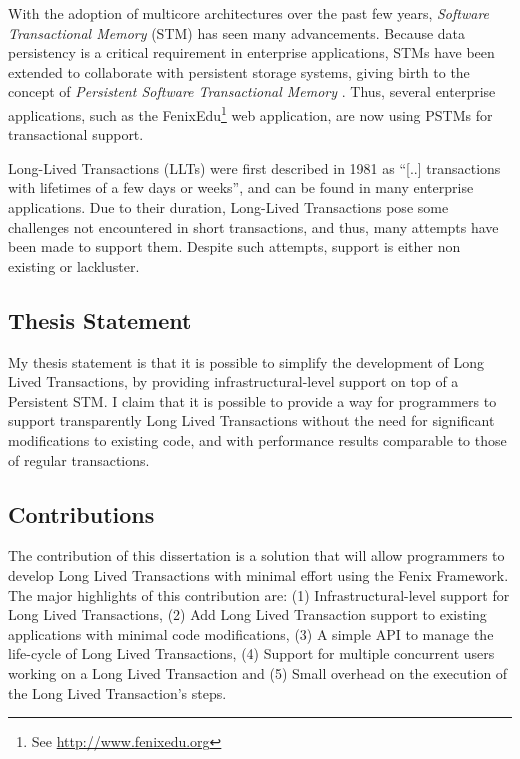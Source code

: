 \documentclass{llncs}
\begin{document}
With the adoption of multicore architectures over the past few years,
{\it Software Transactional Memory} (STM) has seen many advancements.
Because data persistency is a critical requirement in enterprise
applications, STMs have been extended to collaborate with persistent
storage systems, giving birth to the concept of {\it Persistent
  Software Transactional Memory} \cite{fernandes2011strict}. Thus,
several enterprise applications, such as the FenixEdu\footnote{See
  \url{http://www.fenixedu.org}} web application, are now using
PSTMs for transactional support.

Long-Lived Transactions (LLTs) were first described in 1981 as ``[..]
transactions with lifetimes of a few days or
weeks''\cite{gray1981transaction}, and can be found in many enterprise
applications. Due to their duration, Long-Lived Transactions pose some
challenges not encountered in short transactions, and thus, many
attempts have been made to support them. Despite such attempts,
support is either non existing or lackluster.

\subsection{Thesis Statement}

My thesis statement is that it is possible to simplify the development
of Long Lived Transactions, by providing infrastructural-level support
on top of a Persistent STM. I claim that it is possible to provide a
way for programmers to support transparently Long Lived Transactions
without the need for significant modifications to existing code, and
with performance results comparable to those of regular transactions.

\subsection{Contributions}

The contribution of this dissertation is a solution that will allow
programmers to develop Long Lived Transactions with minimal effort
using the Fenix Framework. The major highlights of this contribution
are: (1) Infrastructural-level support for Long Lived Transactions,
(2) Add Long Lived Transaction support to existing applications with
minimal code modifications, (3) A simple API to manage the life-cycle
of Long Lived Transactions, (4) Support for multiple concurrent users
working on a Long Lived Transaction and (5) Small overhead on the
execution of the Long Lived Transaction's steps.
\end{document}

